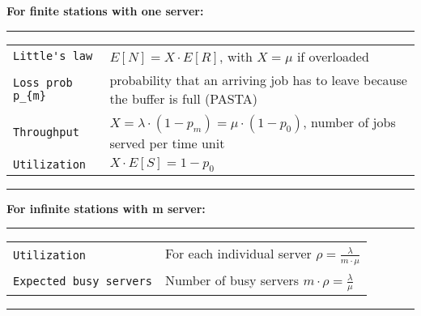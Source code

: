 \textbf{For finite stations with one server:}
\hrule
{}
\begin{tabular}{@{}p{\the\MyLen}@{}p{\linewidth-\the\MyLen}@{}}
\verb!Little's law!				&	$E[N] = X \cdot E[R]$, with $X=\mu$ if overloaded\\
\verb!Loss prob p_{m}!		&	probability that an arriving job has to leave because the buffer is full (PASTA)\\
\verb!Throughput!			&	$X = \lambda \cdot (1-p_{m}) = \mu \cdot (1- p_{0})$, number of jobs served per time unit\\
\verb!Utilization!			&	$X \cdot E[S] = 1 - p_{0}$\\
\end{tabular}
\hrule

\textbf{For infinite stations with m server:}
\hrule
{}
\begin{tabular}{@{}p{\the\MyLen}@{}p{\linewidth-\the\MyLen}@{}}
\verb!Utilization!			&	For each individual server $\rho = \frac{\lambda}{m \cdot \mu}$\\
\verb!Expected busy servers!			&	Number of busy servers $m \cdot \rho = \frac{\lambda}{\mu}$\\
\end{tabular}
\hrule
